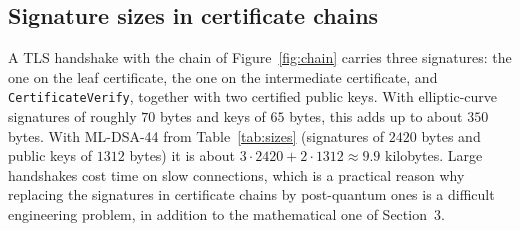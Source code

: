 \documentclass[11pt,a4paper]{article}
\theoremstyle{definition}
\begin{document}
\subsection{Signature sizes in certificate chains}

A TLS handshake with the chain of Figure~\ref{fig:chain} carries three signatures: the one on the leaf certificate, the one on the intermediate certificate, and \texttt{CertificateVerify}, together with two certified public keys. With elliptic-curve signatures of roughly $70$ bytes and keys of $65$ bytes, this adds up to about $350$ bytes. With ML-DSA-44 from Table~\ref{tab:sizes} (signatures of $2420$ bytes and public keys of $1312$ bytes) it is about $3\cdot 2420+2\cdot 1312\approx 9.9$ kilobytes. Large handshakes cost time on slow connections, which is a practical reason why replacing the signatures in certificate chains by post-quantum ones is a difficult engineering problem, in addition to the mathematical one of Section~3.
\end{document}

